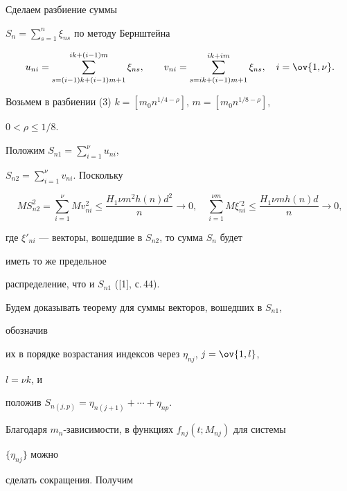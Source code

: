 \begin{pf} Сделаем разбиение суммы 


$S_n=\sum\limits^n_{s=1}\xi_{ns}$ по методу Бернштейна 


\begin{equation} 


u_{ni}=\sum^{ik+(i-1)m}_{s=(i-1)k+(i-1)m+1} 


\xi_{ns},\qquad v_{ni}= 


\sum^{ik+im}_{s=ik+(i-1)m+1}\xi_{ns},\quad i=\ov{1,\nu}. 


\end{equation} 


Возьмем в разбиении (3)\; $k=[m_0n^{1/4-\rho}]$, $m=[m_0n^{1/8-\rho}]$, 


$0<\rho\le 1/8$. 


Положим $S_{n1}=\sum\limits^\nu_{i=1}u_{ni}$, 


$S_{n2}=\sum\limits^\nu_{i=1}v_{ni}$. Поскольку 


\begin{equation} 


M S^2_{n2}=\sum^\nu_{i=1}M v^2_{ni}\le 


\frac{H_1\nu m^2h(n)d^2}{n}\to 0,\quad 


\sum^{\nu m}_{i=1}M\xi{}^{\prime 2}_{ni}\le 


\frac{H_1\nu m h(n)d}{n}\to 0, 


\end{equation} 


где $\xi'_{ni}$ --- векторы, вошедшие в $S_{n2}$, то сумма $S_n$ будет 


иметь то же предельное 


распределение, что и $S_{n1}$ ([1], с.\,44). 


 


Будем доказывать теорему для суммы векторов, вошедших в $S_{n1}$, 


обозначив 


их в порядке возрастания индексов через $\eta_{nj}$, $j=\ov{1,l}$, 


$l=\nu k$, и 


положив $S_{n(j,p)}=\eta_{n(j+1)}+\dotsb+\eta_{np}$. 


Благодаря $m_n$-зависимости, в функциях $f_{nj}(t;M_{nj})$ для системы 


$\{\eta_{nj}\}$ можно 


сделать сокращения. Получим 


$$ 



\end{pf}
